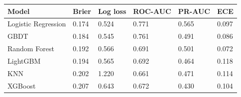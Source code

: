 \begin{tabular}{llllll}
\toprule
Model & Brier & Log loss & ROC-AUC & PR-AUC & ECE \\
\midrule
Logistic Regression & 0.174 & 0.524 & 0.771 & 0.565 & 0.097 \\
GBDT & 0.184 & 0.545 & 0.761 & 0.491 & 0.086 \\
Random Forest & 0.192 & 0.566 & 0.691 & 0.501 & 0.072 \\
LightGBM & 0.194 & 0.565 & 0.692 & 0.464 & 0.118 \\
KNN & 0.202 & 1.220 & 0.661 & 0.471 & 0.114 \\
XGBoost & 0.207 & 0.643 & 0.672 & 0.430 & 0.104 \\
\bottomrule
\end{tabular}
